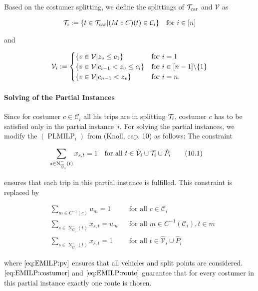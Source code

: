 Based on the costumer splitting, we define the splittings of $\mathcal{T}_{\operatorname{car}}$ and $\mathcal{V}$ as

\begin{align*}
	\mathcal{T}_i := \left\{t\in\mathcal{T}_{\operatorname{car}}|(M\circ C)(t)\in\mathcal{C}_i\right\} && \text{for } i\in[n]
\end{align*}

and

\begin{align*}
	\mathcal{V}_i := \begin{cases}
		\left\{v\in\mathcal{V}|z_v\leq c_1\right\} & \text{for } i=1 \\
		\left\{v\in\mathcal{V}|c_{i-1}<z_v\leq c_i\right\} & \text{for } i\in[n-1]\backslash\{1\} \\
		\left\{v\in\mathcal{V}|c_{n-1}<z_v\right\} & \text{for } i=n.
	\end{cases}
\end{align*}

\paragraph{Solving of the Partial Instances} \parfill

Since for costumer $c\in\mathcal{C}_i$ all his trips are in splitting $\mathcal{T}_i$, costumer $c$ has to be satisfied only in the partial instance~$i$. For solving the partial instances, we modify the $(\operatorname{PLMILP}_i)$ from (Knoll, cap. 10) as follows: The constraint 

\begin{align}
	\sum_{s\in\operatorname{N}_{\overline{G}_i}^-(t)} x_{s,t} = 1 &&& \text{for all } t\in\hat{\mathcal{V}}_i\cup\mathcal{T}_i\cup\hat{P}_i \tag{10.1}
\end{align}

ensures that each trip in this partial instance is fulfilled. This constraint is replaced by

\begin{align}
	& \sum_{m\in C^{-1}(c)} u_m = 1 && \text{for all } c\in\mathcal{C}_i \label{eq:EMILP:costumer} \\
	&\sum_{s\in\operatorname{N}_{\overline{G}_i}^-(t)} x_{s,t} = u_m && \text{for all } m\in C^{-1}\left(\mathcal{C}_i\right), t\in m \label{eq:EMILP:route} \\
	&\sum_{s\in\operatorname{N}_{\overline{G}_i}^-(t)} x_{s,t} = 1 && \text{for all } t\in\hat{\mathcal{V}}_i\cup\hat{P}_i \label{eq:EMILP:pv}
\end{align}

where $\eqref{eq:EMILP:pv}$ ensures that all vehicles and split points are considered. $\eqref{eq:EMILP:costumer}$ and $\eqref{eq:EMILP:route}$ guarantee that for every costumer in this partial instance exactly one route is chosen.

